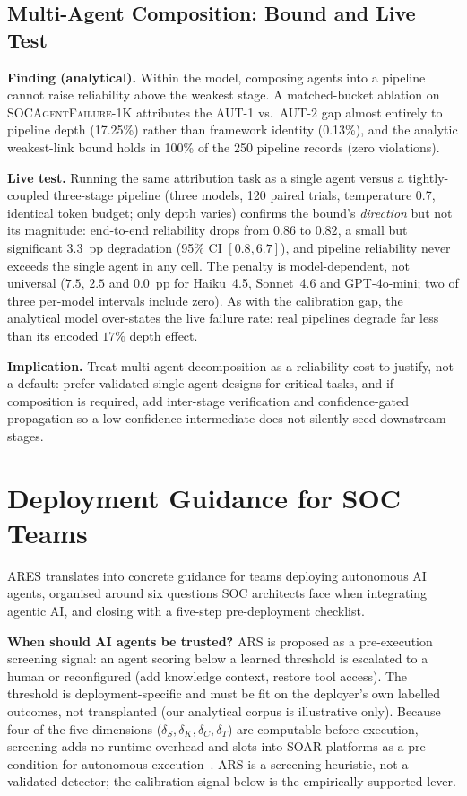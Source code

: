 \documentclass[journal,compsoc]{IEEEtran}
\newcommand{\ARES}{\textsc{ARES}}
\newcommand{\SAFK}{\textsc{SOCAgentFailure-1K}}
\begin{document}
\subsection{Multi-Agent Composition: Bound and Live Test}

\textbf{Finding (analytical).} Within the model, composing agents into
a pipeline cannot raise reliability above the weakest stage. A
matched-bucket ablation on \SAFK{} attributes the AUT-1 vs.\ AUT-2 gap
almost entirely to pipeline depth (17.25\%) rather than framework
identity (0.13\%), and the analytic weakest-link bound holds in 100\%
of the 250 pipeline records (zero violations).

\textbf{Live test.} Running the same attribution task as a single agent
versus a tightly-coupled three-stage pipeline (three models, 120 paired
trials, temperature 0.7, identical token budget; only depth varies)
confirms the bound's \emph{direction} but not its magnitude: end-to-end
reliability drops from $0.86$ to $0.82$, a small but significant
$3.3$~pp degradation (95\% CI $[0.8, 6.7]$), and pipeline reliability
never exceeds the single agent in any cell. The penalty is
model-dependent, not universal ($7.5$, $2.5$ and $0.0$~pp for
Haiku~4.5, Sonnet~4.6 and GPT-4o-mini; two of three per-model intervals
include zero). As with the calibration gap, the
analytical model over-states the live failure rate: real pipelines
degrade far less than its encoded $17\%$ depth effect.

\textbf{Implication.} Treat multi-agent decomposition as a reliability
cost to justify, not a default: prefer validated single-agent designs
for critical tasks, and if composition is required, add inter-stage
verification and confidence-gated propagation so a low-confidence
intermediate does not silently seed downstream stages.

\section{Deployment Guidance for SOC Teams}

\ARES{} translates into concrete guidance for teams deploying
autonomous AI agents, organised around six questions SOC architects
face when integrating agentic AI, and closing with a five-step
pre-deployment checklist.

\textbf{When should AI agents be trusted?}
ARS is proposed as a pre-execution screening signal: an agent scoring
below a learned threshold is escalated to a human or reconfigured
(add knowledge context, restore tool access). The threshold is
deployment-specific and must be fit on the deployer's own labelled
outcomes, not transplanted (our analytical corpus is illustrative
only). Because four of the five dimensions ($\delta_S, \delta_K,
\delta_C, \delta_T$) are computable before execution, screening adds no
runtime overhead and slots into SOAR platforms as a pre-condition for
autonomous execution~\cite{nist_ai_rmf}. ARS is a screening heuristic,
not a validated detector; the calibration signal below is the
empirically supported lever.
\end{document}
